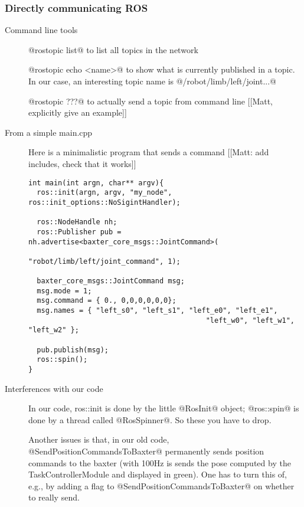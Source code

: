 \documentclass[10pt,fleqn,twoside]{article}
\newenvironment{code}{\footnotesize}{}
\begin{document}
\subsubsection{Directly communicating ROS}

\begin{description}
\item[Command line tools]

@rostopic list@ to list all topics in the network

@rostopic echo <name>@ to show what is currently published in a
topic. In our case, an interesting topic name is @/robot/limb/left/joint...@

@rostopic ???@ to actually send a topic from command line [[Matt,
    explicitly give an example]]

\item[From a simple main.cpp] Here is a minimalistic program that sends a
  command [[Matt: add includes, check that it works]]
\begin{code}
\begin{Verbatim}
int main(int argn, char** argv){
  ros::init(argn, argv, "my_node", ros::init_options::NoSigintHandler);

  ros::NodeHandle nh;
  ros::Publisher pub = nh.advertise<baxter_core_msgs::JointCommand>(
                                       "robot/limb/left/joint_command", 1);

  baxter_core_msgs::JointCommand msg;
  msg.mode = 1;
  msg.command = { 0., 0,0,0,0,0,0};
  msg.names = { "left_s0", "left_s1", "left_e0", "left_e1",
                                          "left_w0", "left_w1", "left_w2" };

  pub.publish(msg);
  ros::spin();
}
\end{Verbatim}
\end{code}

\item[Interferences with our code] In our code, ros::init is done by the little
  @RosInit@ object; @ros::spin@ is done by a thread called
  @RosSpinner@. So these you have to drop.

  Another issues is that, in our old code,
  @SendPositionCommandsToBaxter@ permanently sends position commands
  to the baxter (with 100Hz is sends the pose computed
  by the TaskControllerModule and displayed in green). One has to
  turn this of, e.g., by adding a flag to
  @SendPositionCommandsToBaxter@ on whether to really send.
\end{description}
\end{document}
